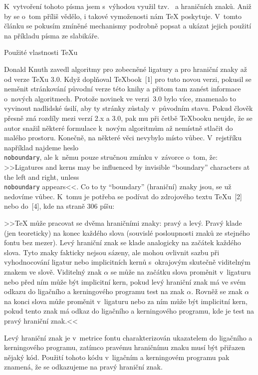K~vytvoření tohoto písma jsem s~výhodou využil tzv.~ a hraničních znaků. Aniž by se o~tom příliš vědělo, i takové
vymoženosti nám \TeX{} poskytuje. V~tomto článku se pokusím zmíněné
mechanismy podrobně popsat a ukázat jejich použití na příkladu písma
ze slabikáře.

\sub Použité vlastnosti \TeX{}u

Donald Knuth zavedl algoritmy pro zobecněné ligatury a pro hraniční znaky
až od verze \TeX{}u 3.0. Když doplňoval \TeX{}book~[1] pro tuto novou
verzi, pokusil se neměnit stránkování původní verze této knihy a přitom
tam zanést informace o~nových algoritmech. Protože novinek ve verzi~3.0
bylo více, znamenalo to vyvinout nadlidské úsilí, aby ty stránky zůstaly
v~původním stavu. Pokud člověk přesně zná rozdíly mezi verzí 2.x a 3.0, pak
mu při četbě \TeX{}booku neujde, že se autor snažil některé formulace
k~novým algoritmům až nemístně stlačit do malého prostoru. Konečně, na
některé věci nevybylo místo vůbec. V~rejstříku například najdeme heslo
{\tt\\noboundary}, ale k~němu pouze stručnou zmínku v~závorce o~tom, že:
>>Ligatures and kerns may be influenced by invisible ``boundary''
characters at the left and right, unless {\tt\\noboundary} appears<<. Co to
ty ``boundary'' (hraniční) znaky jsou, se už nedovíme vůbec. K~tomu je
potřeba se podívat do zdrojového textu \TeX{}u~[2] nebo do~[4], kde na
straně 306 píšu:

>>\TeX{} může pracovat se dvěma hraničními znaky: pravý a levý. Pravý klade
(jen teoreticky) na konec každého slova (souvislé posloupnosti znaků ze
stejného fontu bez mezer). Levý hraniční znak se klade analogicky na
začátek každého slova. Tyto znaky fakticky nejsou sázeny, ale mohou ovlivnit
sazbu při vyhodnocování ligatur nebo implicitních kernů s~okrajovým
skutečně viditelným znakem ve slově. Viditelný znak $\alpha$ se může na
začátku slova proměnit v~ligaturu nebo před ním může být implicitní kern,
pokud levý hraniční znak má ve svém odkazu do ligačního a kerningového
programu test na znak $\alpha$. Rovněž se znak $\alpha$ na konci slova může
proměnit v~ligaturu nebo za ním může být implicitní kern, pokud tento
znak má odkaz do ligačního a kerningového programu, kde je test na pravý
hraniční znak.<<

Levý hraniční znak je v~metrice fontu charakterizován ukazatelem do
ligačního a kerningového programu, zatímco pravému hraničnímu znaku
musí být přiřazen nějaký kód. Použití tohoto kódu v~ligačním a
kerningovém programu pak znamená, že se odkazujeme na pravý hraniční znak.

